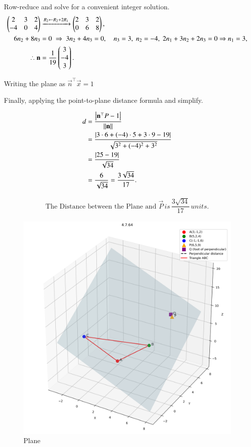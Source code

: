 \documentclass[journal]{IEEEtran}
\begin{document}
Row-reduce and solve for a convenient integer solution.
\begin{align}
\begin{pmatrix}2 & 3 & 2\\ -4 & 0 & 4\end{pmatrix}
&\xrightarrow{R_2\leftarrow R_2+2R_1}
\begin{pmatrix}2 & 3 & 2\\ 0 & 6 & 8\end{pmatrix},\\
6n_2+8n_3&=0 \;\Rightarrow\; 3n_2+4n_3=0, \quad
n_3=3,\; n_2=-4,\; 2n_1+3n_2+2n_3=0 \Rightarrow n_1=3,\\
\therefore \mathbf{n} &= \frac{1}{19}\begin{pmatrix}3\\-4\\3\end{pmatrix}.
\end{align}

Writing the plane as $\vec{n}^\top\vec{x} = 1$

\newpage

Finally, applying the point-to-plane distance formula and simplify.

\begin{align}
d &= \frac{\left\vert\mathbf{n}^\top P - 1\right\vert}{\left\lVert\mathbf{n}\right\rVert}\\
&= \frac{\left\vert3\cdot 6+(-4)\cdot 5+3\cdot 9-19\right\vert}{\sqrt{3^2+(-4)^2+3^2}}\\
&= \frac{\left\vert25-19\right\vert}{\sqrt{34}}\\
&= \frac{6}{\sqrt{34}}=\frac{3\sqrt{34}}{17}.
\end{align}

\begin{align}
    \boxed{\text{The Distance between the Plane and } \vec{P} \, is \, \dfrac{3\sqrt{34}}{17} \, units.}
\end{align}

\begin{figure}[htbp]
    \centering
    \includegraphics[width=\columnwidth]{figs/fig1.png}
    \caption{Plane}
    \label{fig:fig/fig1.png}
\end{figure}
\end{document}
